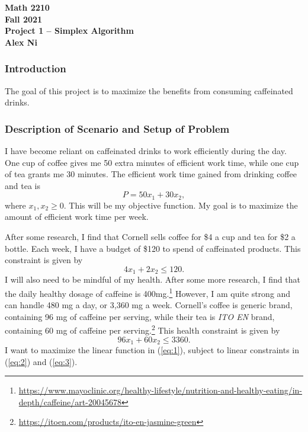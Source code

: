 \documentclass[letterpaper,11pt]{article}
\begin{document}
\begin{center} \textbf{Math 2210 \\ Fall 2021 \\ Project 1 -- Simplex Algorithm \\ Alex Ni \\}
\hrulefill
\end{center}

\subsubsection*{Introduction}
The goal of this project is to maximize the benefits from consuming caffeinated drinks.


\subsubsection*{Description of Scenario and Setup of Problem}
I have become reliant on caffeinated drinks to work efficiently during the day. One cup of coffee gives me 50 extra minutes of efficient work time, while one cup of tea grants me 30 minutes. The efficient work time gained from drinking coffee and tea is 
\begin{equation} \label{eq:1}
P = 50x_1 + 30x_2,
\end{equation}
where $x_1, x_2 \geq 0$.
This will be my objective function. My goal is to maximize the amount of efficient work time per week. \vspace{3mm}

\noindent After some research, I find that Cornell sells coffee for \$4 a cup and tea for \$2 a bottle. Each week, I have a budget of \$120 to spend of caffeinated products.  This constraint is given by
\begin{equation} \label{eq:2}
4x_1 + 2x_2 \leq 120.
\end{equation}
I will also need to be mindful of my health. After some more research, I find that the daily healthy dosage of caffeine is 400mg.\footnote{\href{https://www.mayoclinic.org/healthy-lifestyle/nutrition-and-healthy-eating/in-depth/caffeine/art-20045678}{https://www.mayoclinic.org/healthy-lifestyle/nutrition-and-healthy-eating/in-depth/caffeine/art-20045678}} However, I am quite strong and can handle 480 mg a day, or 3,360 mg a week. Cornell's coffee is generic brand, containing 96 mg of caffeine per serving, while their tea is \textit{ITO EN} brand, containing 60 mg of caffeine per serving.\footnote{\href{https://itoen.com/products/ito-en-jasmine-green}{https://itoen.com/products/ito-en-jasmine-green}} This health constraint is given by
\begin{equation} \label{eq:3}
96x_1 + 60x_2 \leq \num[group-separator={,}]{3360}.
\end{equation}
I want to maximize the linear function in (\ref{eq:1}), subject to linear constraints in (\ref{eq:2}) and (\ref{eq:3}).
\end{document}
